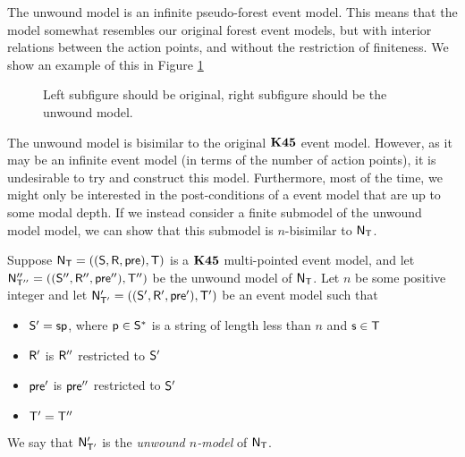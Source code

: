 The unwound model is an infinite pseudo-forest event model.
This means that the model somewhat resembles our original forest event models,
but with interior relations between the action points, and without the
restriction of finiteness.
We show an example of this in Figure \ref{generatedTreeExample}

\begin{figure}[ht!]
\centering
\caption{\FIXME Left subfigure should be original, right subfigure should be the
unwound model.} \label{generatedTreeExample}
\end{figure}

The unwound model is bisimilar to the original $\bf K45$ event model.
However, as it may be an infinite event model (in terms of the number of action
points), it is undesirable to try and construct this model.
Furthermore, most of the time, we might only be interested in the
post-conditions of a event model that are up to some modal depth.
If we instead consider a finite submodel of the unwound model
model, we can show that this submodel is $n$-bisimilar to $\mathrm{\mathsf{N}}_\mathrm{\mathsf{T}}$.

\begin{defn} \label{unwoundNModel}
  Suppose $\mathrm{\mathsf{N}}_\mathrm{\mathsf{T}} = ((\mathrm{\mathsf{S}},\mathrm{\mathsf{R}},\mathrm{\mathsf{pre}}),\mathrm{\mathsf{T}})$ is a $\bf K45$ multi-pointed event model, and
	let $\mathrm{\mathsf{N}}''_{\mathrm{\mathsf{T}}''} = ((\mathrm{\mathsf{S}}'',\mathrm{\mathsf{R}}'',\mathrm{\mathsf{pre}}''),\mathrm{\mathsf{T}}'')$ be the unwound model of $\mathrm{\mathsf{N}}_\mathrm{\mathsf{T}}$.
  Let $n$ be some positive integer and let $\mathrm{\mathsf{N}}'_{\mathrm{\mathsf{T}}'} = ((\mathrm{\mathsf{S}}',\mathrm{\mathsf{R}}',\mathrm{\mathsf{pre}}'),\mathrm{\mathsf{T}}')$ be an event model such that
  \begin{itemize}
		\item $\mathrm{\mathsf{S}}' = \mathrm{\mathsf{s}} \mathrm{\mathsf{p}}$, where $\mathrm{\mathsf{p}} \in \mathrm{\mathsf{S}}^\ast$ is a string of length
    less than $n$ and $\mathrm{\mathsf{s}} \in \mathrm{\mathsf{T}}$
		\item $\mathrm{\mathsf{R}}'$ is $\mathrm{\mathsf{R}}''$ restricted to $\mathrm{\mathsf{S}}'$
		\item $\mathrm{\mathsf{pre}}'$ is $\mathrm{\mathsf{pre}}''$ restricted to $\mathrm{\mathsf{S}}'$
		\item $\mathrm{\mathsf{T}}' = \mathrm{\mathsf{T}}''$
  \end{itemize}
  We say that $\mathrm{\mathsf{N}}'_{\mathrm{\mathsf{T}}'}$ is the {\em unwound $n$-model} of $\mathrm{\mathsf{N}}_\mathrm{\mathsf{T}}$.
\end{defn}

